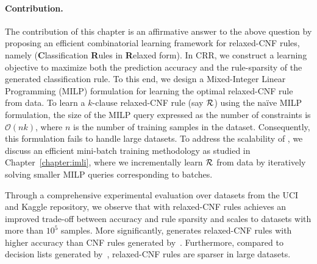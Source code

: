 \paragraph{Contribution.} The contribution of this chapter is an affirmative answer to the above question by proposing an efficient combinatorial learning framework for relaxed-CNF rules, namely {\crr} (\textbf{C}lassification \textbf{R}ules in \textbf{R}elaxed form). In CRR, we construct a learning objective to maximize both the prediction accuracy and the rule-sparsity of the generated classification rule. To this end, we design a  Mixed-Integer Linear Programming (MILP) formulation for learning the optimal relaxed-CNF rule from data. To learn a $ k $-clause relaxed-CNF rule (say $ {\mathcal{R}} $) using the na\"ive MILP formulation, the size of the MILP query expressed as the number of constraints is $ \mathcal{O}(nk) $, where $ n $ is the number of training samples in the dataset. Consequently, this formulation fails to handle large datasets. To address the scalability of {\crr},  we discuss an efficient mini-batch training methodology as studied in Chapter~\ref{chapter:imli}, where we incrementally learn $ {\mathcal{R}} $ from data by iteratively solving smaller MILP queries corresponding to batches. 

{Through a comprehensive experimental evaluation over datasets from the UCI and Kaggle repository, we observe that {\crr} with relaxed-CNF rules achieves an improved trade-off between accuracy and rule sparsity and scales to datasets with more than $ 10^5 $ samples. More significantly, {\crr} generates relaxed-CNF rules with higher accuracy than CNF rules generated by~\cite{GM2019}. Furthermore, compared to decision lists generated by~\cite{cohen1995fast}, relaxed-CNF rules are sparser in large datasets.}
%


